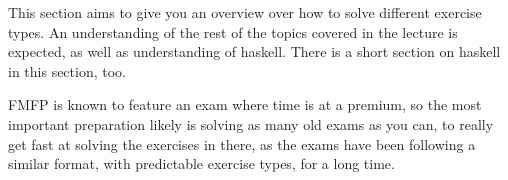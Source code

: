This section aims to give you an overview over how to solve different exercise types.
An understanding of the rest of the topics covered in the lecture is expected, as well as understanding of haskell.
There is a short section on haskell in this section, too.

FMFP is known to feature an exam where time is at a premium, so the most important preparation likely is solving as many old exams as you can,
to really get fast at solving the exercises in there, as the exams have been following a similar format, with predictable exercise types, for a long time.
